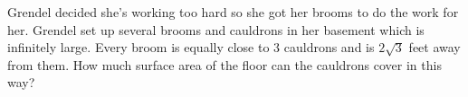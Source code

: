 


Grendel decided she's working too hard so she got her brooms to do the work for her. Grendel set up several brooms and cauldrons in her basement which is infinitely large. Every broom is equally close to 3 cauldrons and is $2{\sqrt{3}}$ feet away from them. How much surface area of the floor can the cauldrons cover in this way?
